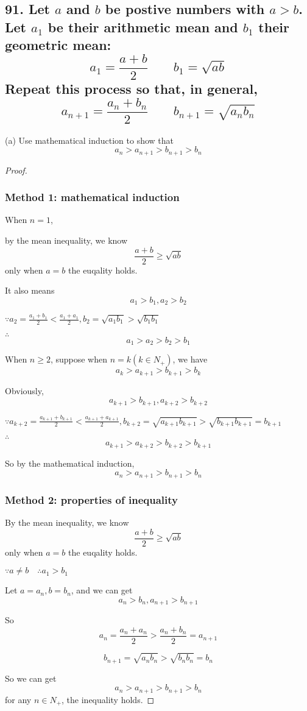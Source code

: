 \documentclass{article}
\begin{document}
    \subsection*{91. Let $a$ and $b$ be postive numbers with $a > b$. Let $a_1$ be their arithmetic mean and $b_1$ their geometric mean: $$a_1 = \frac{a + b}{2} \qquad b_1 = \sqrt{ab}$$ Repeat this process so that, in general, $$a_{n+1} = \frac{a_n + b_n}{2} \qquad b_{n+1} = \sqrt{a_nb_n}$$}

    (a) Use mathematical induction to show that $$a_n > a_{n+1} > b_{n+1} > b_n$$

    \begin{proof}

        \subsubsection*{Method 1: mathematical induction}

        When $n = 1$,

        by the mean inequality, we know $$\frac{a+b}{2} \geq \sqrt{ab}$$ only when $a=b$ the euqality holds.

        It also means $$a_1 > b_1, a_2 > b_2$$

        $\because a_2 = \frac{a_1 + b_1}{2} < \frac{a_1 + a_1}{2}, b_2 = \sqrt{a_1 b_1} > \sqrt{b_1b_1}$

        $\therefore$ $$a_1 > a_2 > b_2 > b_1$$

        When $n \geq 2$, suppose when $n = k(k \in N_+)$, we have $$a_k > a_{k + 1} > b_{k + 1} > b_k$$

        Obviously, $$a_{k + 1} > b_{k + 1}, a_{k + 2} > b_{k + 2}$$

        $\because a_{k + 2} = \frac{a_{k + 1} + b_{k + 1}}{2} < \frac{a_{k + 1} + a_{k + 1}}{2}, b_{k + 2} = \sqrt{a_{k + 1}b_{k + 1}} > \sqrt{b_{k + 1}b_{k + 1}} = b_{k + 1}$

        $\therefore$ $$a_{k + 1} > a_{k + 2} > b_{k + 2} > b_{k + 1}$$

        So by the mathematical induction, $$a_n > a_{n + 1} > b_{n + 1} > b_n$$

        \subsubsection*{Method 2: properties of inequality}

        By the mean inequality, we know $$\frac{a+b}{2} \geq \sqrt{ab}$$only when $a=b$ the euqality holds.

        $\because a \not = b \quad  \therefore a_1 > b_1$

        Let $a = a_n, b = b_n$, and we can get $$a_n > b_n, a_{n+1} > b_{n+1}$$

        So $$a_n = \frac{a_n + a_n}{2} > \frac{a_n + b_n}{2} = a_{n+1}$$

        $$b_{n+1} = \sqrt{a_nb_n} > \sqrt{b_nb_n} = b_n$$

        So we can get $$a_n > a_{n+1} > b_{n+1} > b_n$$ for any $n \in N_+$, the inequality holds.
    \end{proof}
\end{document}

